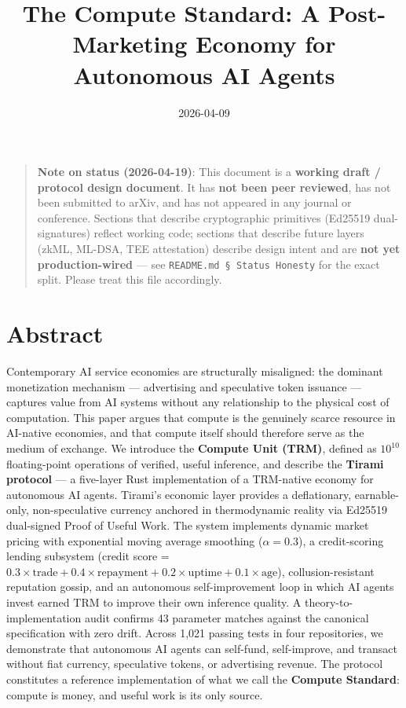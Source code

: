 \documentclass[
  11pt,
]{article}
\title{The Compute Standard: A Post-Marketing Economy for Autonomous AI
Agents}
\author{}
\date{2026-04-09}
\begin{document}
\maketitle

{
\setcounter{tocdepth}{2}
\tableofcontents
}
\begin{quote}
\textbf{Note on status (2026-04-19)}: This document is a \textbf{working
draft / protocol design document}. It has \textbf{not been peer
reviewed}, has not been submitted to arXiv, and has not appeared in any
journal or conference. Sections that describe cryptographic primitives
(Ed25519 dual-signatures) reflect working code; sections that describe
future layers (zkML, ML-DSA, TEE attestation) describe design intent and
are \textbf{not yet production-wired} --- see
\texttt{README.md\ §\ Status\ Honesty} for the exact split. Please treat
this file accordingly.
\end{quote}

\section{Abstract}\label{abstract}

Contemporary AI service economies are structurally misaligned: the
dominant monetization mechanism --- advertising and speculative token
issuance --- captures value from AI systems without any relationship to
the physical cost of computation. This paper argues that compute is the
genuinely scarce resource in AI-native economies, and that compute
itself should therefore serve as the medium of exchange. We introduce
the \textbf{Compute Unit (TRM)}, defined as \(10^{10}\) floating-point
operations of verified, useful inference, and describe the
\textbf{Tirami protocol} --- a five-layer Rust implementation of a
TRM-native economy for autonomous AI agents. Tirami's economic layer
provides a deflationary, earnable-only, non-speculative currency
anchored in thermodynamic reality via Ed25519 dual-signed Proof of
Useful Work. The system implements dynamic market pricing with
exponential moving average smoothing (\(\alpha = 0.3\)), a
credit-scoring lending subsystem (credit score =
\(0.3 \times \text{trade} + 0.4 \times \text{repayment} + 0.2 \times \text{uptime} + 0.1 \times \text{age}\)),
collusion-resistant reputation gossip, and an autonomous
self-improvement loop in which AI agents invest earned TRM to improve
their own inference quality. A theory-to-implementation audit confirms
43 parameter matches against the canonical specification with zero
drift. Across 1,021 passing tests in four repositories, we demonstrate
that autonomous AI agents can self-fund, self-improve, and transact
without fiat currency, speculative tokens, or advertising revenue. The
protocol constitutes a reference implementation of what we call the
\textbf{Compute Standard}: compute is money, and useful work is its only
source.
\end{document}
